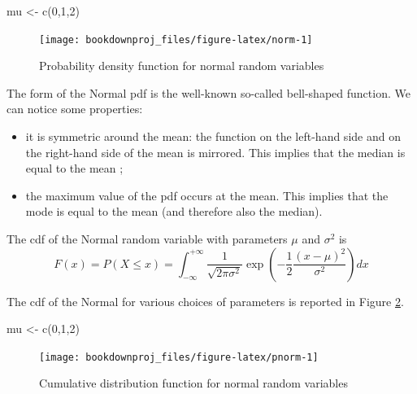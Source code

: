 \documentclass[
]{book}
\newenvironment{Shaded}{\begin{snugshade}}{\end{snugshade}}
\newcommand{\DecValTok}[1]{\textcolor[rgb]{0.00,0.00,0.81}{#1}}
\newcommand{\FunctionTok}[1]{\textcolor[rgb]{0.00,0.00,0.00}{#1}}
\newcommand{\NormalTok}[1]{#1}
\newcommand{\OtherTok}[1]{\textcolor[rgb]{0.56,0.35,0.01}{#1}}
\theoremstyle{definition}
\theoremstyle{definition}
\theoremstyle{definition}
\theoremstyle{definition}
\theoremstyle{remark}
\begin{document}
\begin{Shaded}
\begin{Highlighting}[]
\NormalTok{mu }\OtherTok{\textless{}{-}} \FunctionTok{c}\NormalTok{(}\DecValTok{0}\NormalTok{,}\DecValTok{1}\NormalTok{,}\DecValTok{2}\NormalTok{)}
\end{Highlighting}
\end{Shaded}

\begin{figure}

{\centering \texttt{[image: bookdownproj\_files/figure-latex/norm-1]} 

}

\caption{Probability density function for normal random variables}\label{fig:norm}
\end{figure}

The form of the Normal pdf is the well-known so-called bell-shaped function. We can notice some properties:

\begin{itemize}
\item
  it is symmetric around the mean: the function on the left-hand side and on the right-hand side of the mean is mirrored. This implies that the median is equal to the mean ;
\item
  the maximum value of the pdf occurs at the mean. This implies that the mode is equal to the mean (and therefore also the median).
\end{itemize}

The cdf of the Normal random variable with parameters \(\mu\) and \(\sigma^2\) is
\[
F(x) = P(X\leq x)=\int_{-\infty}^{+\infty}\frac{1}{\sqrt{2\pi\sigma^2}}\exp\left(-\frac{1}{2}\frac{(x-\mu)^2}{\sigma^2}\right)dx
\]

The cdf of the Normal for various choices of parameters is reported in Figure \ref{fig:pnorm}.

\begin{Shaded}
\begin{Highlighting}[]
\NormalTok{mu }\OtherTok{\textless{}{-}} \FunctionTok{c}\NormalTok{(}\DecValTok{0}\NormalTok{,}\DecValTok{1}\NormalTok{,}\DecValTok{2}\NormalTok{)}
\end{Highlighting}
\end{Shaded}

\begin{figure}

{\centering \texttt{[image: bookdownproj\_files/figure-latex/pnorm-1]} 

}

\caption{Cumulative distribution function for normal random variables}\label{fig:pnorm}
\end{figure}
\end{document}
